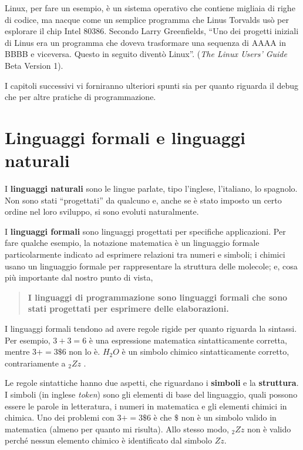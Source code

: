 \documentclass[10pt]{book}
\begin{document}
Linux, per fare un esempio, è un sistema operativo che contiene migliaia di righe di codice, ma nacque come un semplice programma che Linus Torvalds usò per esplorare il chip Intel 80386. Secondo Larry Greenfields, ``Uno dei progetti iniziali di Linus era un programma che doveva trasformare una sequenza di AAAA in BBBB e viceversa. Questo in seguito diventò Linux''. ({\em The Linux Users' Guide} Beta Version 1).

I capitoli successivi vi forniranno ulteriori spunti sia per quanto riguarda il debug che per altre pratiche di programmazione.


\section{Linguaggi formali e linguaggi naturali}

I {\bf linguaggi naturali} sono le lingue parlate, tipo l'inglese, l'italiano, lo spagnolo. Non sono stati ``progettati'' da qualcuno e, anche se è stato imposto un certo ordine nel loro sviluppo, si sono evoluti naturalmente.

I {\bf linguaggi formali} sono linguaggi progettati per specifiche   applicazioni. Per fare qualche esempio, la notazione matematica è un linguaggio formale particolarmente indicato ad esprimere relazioni tra numeri e simboli; i chimici usano un linguaggio formale per rappresentare la struttura delle molecole; e, cosa più importante dal nostro punto di vista, 

\begin{quote}
{\bf I linguaggi di programmazione sono linguaggi formali che sono
   stati progettati per esprimere delle elaborazioni.}
\end{quote}

I linguaggi formali tendono ad avere regole rigide per quanto riguarda la sintassi. Per esempio,
$3 + 3 = 6$ è una espressione matematica sintatticamente corretta, mentre
$3 + = 3 \mbox{\$} 6$ non lo è.
$H_2O$ è un simbolo chimico sintatticamente corretto, contrariamente a $_2Zz$ .

Le regole sintattiche hanno due aspetti, che riguardano i {\bf simboli} e la
{\bf struttura}. I simboli (in inglese {\em token}) sono gli elementi di base del linguaggio, quali possono essere le parole in letteratura, i numeri in matematica e gli elementi chimici in chimica. Uno dei problemi con 
$3 + = 3 \mbox{\$} 6$ è che \( \$ \) non è un simbolo valido in matematica
(almeno per quanto mi risulta). Allo stesso modo, $_2Zz$ non è valido perché nessun elemento chimico è identificato dal simbolo $Zz$.
\end{document}
